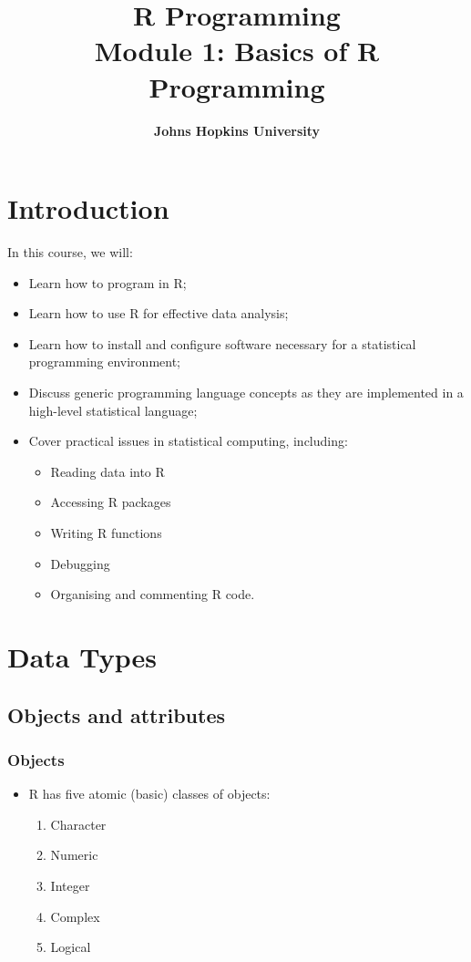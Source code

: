 \documentclass[10pt,a4paper,twoside]{article}\usepackage[]{graphicx}\usepackage[]{xcolor}
\title{\Large \textbf{R Programming \\ 
                      \large Module 1: Basics of R Programming}}
\author{\large \textbf{Johns Hopkins University}}
\begin{document}
\maketitle
\tableofcontents
\newpage

\section{Introduction}

In this course, we will:

\begin{itemize}
  \item Learn how to program in R;
  \item Learn how to use R for effective data analysis;
  \item Learn how to install and configure software necessary for a statistical programming environment;
  \item Discuss generic programming language concepts as they are implemented in a high-level statistical language;
  \item Cover practical issues in statistical computing, including:
    \begin{itemize}
      \item Reading data into R
      \item Accessing R packages
      \item Writing R functions
      \item Debugging
      \item Organising and commenting R code.
    \end{itemize}
\end{itemize}

\section{Data Types}

\subsection{Objects and attributes}

\subsubsection{Objects}

\begin{itemize}
  \item R has five atomic (basic) classes of objects:
    \begin{enumerate}
      \item Character
      \item Numeric
      \item Integer
      \item Complex
      \item Logical
    \end{enumerate}
\end{itemize}
\end{document}
